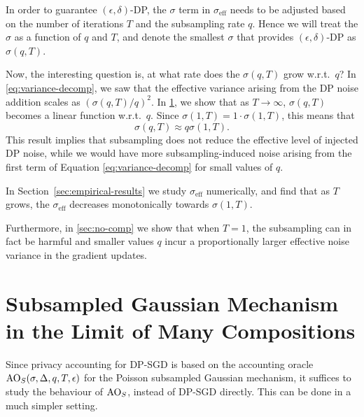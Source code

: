 \documentclass{article}
\theoremstyle{plain}
\theoremstyle{definition}
\theoremstyle{remark}
\begin{document}
In order to guarantee $(\epsilon, \delta)$-DP, the $\sigma$ term in $\sigma_{\text{eff}}$ needs to 
be adjusted based on the number of iterations $T$ and the subsampling rate 
$q$. Hence we will treat the $\sigma$ as a function of $q$ and $T$, and denote 
the smallest $\sigma$ that provides $(\epsilon, \delta)$-DP as $\sigma(q, T)$. 

Now, the interesting question is, at what rate does the $\sigma(q, T)$ grow w.r.t.~$q$? 
In \cref{eq:variance-decomp}, we saw that the effective variance arising from
the DP noise addition scales as $(\sigma(q,T) / q)^2$. 
In \cref{sec:asym-linear-sigma}, we show that as $T \rightarrow \infty$, 
$\sigma(q, T)$ becomes a linear function w.r.t.\ $q$.
Since $\sigma(1, T) = 1\cdot \sigma(1, T)$, this means that
\begin{equation}
    \sigma(q, T) \approx q\sigma(1, T). 
\end{equation}
This result implies that subsampling does not reduce the effective level of 
injected DP noise, while we would have more subsampling-induced noise arising from the first term
of Equation \eqref{eq:variance-decomp} for small values of $q$. 

In Section~\ref{sec:empirical-results} we study $\sigma_{\text{eff}}$ 
numerically, and find that as $T$ grows, the $\sigma_{\text{eff}}$ decreases 
monotonically towards $\sigma(1, T)$.

Furthermore, in \cref{sec:no-comp} we show that when $T=1$, the subsampling 
can in fact be harmful and smaller values $q$ incur a proportionally larger effective noise 
variance in the gradient updates.

\section{Subsampled Gaussian Mechanism in the Limit of Many Compositions}
\label{sec:asym-linear-sigma}

Since privacy accounting for DP-SGD is based on the accounting oracle $\mathrm{AO}_S(\sigma, \Delta, q, T, \epsilon)$ for the Poisson
subsampled Gaussian mechanism, it suffices to study the behaviour of $\mathrm{AO}_S$, instead of DP-SGD directly.
This can be done in a much simpler setting. 
\end{document}
